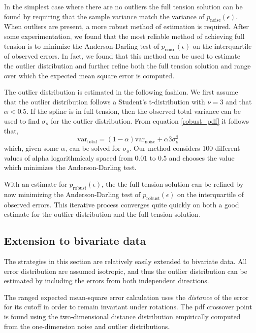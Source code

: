 \documentclass[10pt,journal]{IEEEtran}
\begin{document}
In the simplest case where there are no outliers the full tension solution can be found by requiring that the sample variance match the variance of $p_{\textrm{noise}}(\epsilon)$. When outliers are present, a more robust method of estimation is required. After some experimentation, we found that the most reliable method of achieving full tension is to minimize the Anderson-Darling test of $p_{\textrm{noise}}(\epsilon)$ on the interquartile of observed errors. In fact, we found that this method can be used to estimate the outlier distribution and further refine both the full tension solution and range over which the expected mean square error is computed.

The outlier distribution is estimated in the following fashion. We first assume that the outlier distribution follows a Student's t-distribution with $\nu=3$ and that $\alpha<0.5$. If the spline is in full tension, then the observed total variance can be used to find $\sigma_o$ for the outlier distribution. From equation \ref{robust_pdf} it follows that,
\begin{equation}
    \textrm{var}_\textrm{total} = (1-\alpha) \textrm{var}_\textrm{noise} + \alpha 3 \sigma_o^2
\end{equation}
which, given some $\alpha$, can be solved for $\sigma_o$. Our method considers 100 different values of alpha logarithmicaly spaced from $0.01$ to $0.5$ and chooses the value which minimizes the Anderson-Darling test.

With an estimate for $p_{\textrm{robust}}(\epsilon)$, the the full tension solution can be refined by now minimizing the Anderson-Darling test of $p_{\textrm{robust}}(\epsilon)$ on the interquartile of observed errors. This iterative process converges quite quickly on both a good estimate for the outlier distribution and the full tension solution.


\subsection{Extension to bivariate data}
\label{sec:robust_bivariate}

The strategies in this section are relatively easily extended to bivariate data. All error distribution are assumed isotropic, and thus the outlier distribution can be estimated by including the errors from both independent directions.

The ranged expected mean-square error calculation uses the \emph{distance} of the error for its cutoff in order to remain invariant under rotations. The pdf crossover point is found using the two-dimensional distance distribution empirically computed from the one-dimension noise and outlier distributions.
\end{document}
